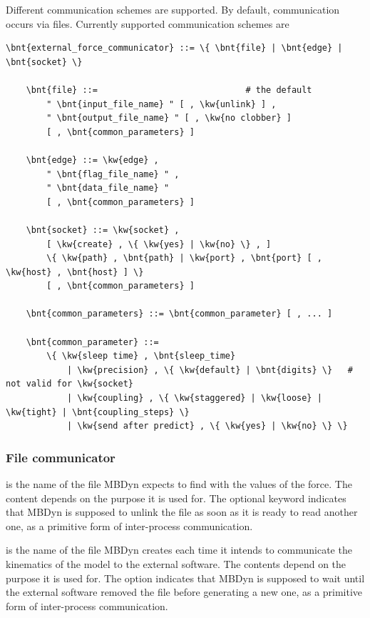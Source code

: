 Different communication schemes are supported.
By default, communication occurs via files.
Currently supported communication schemes are
\begin{Verbatim}[commandchars=\\\{\}]
    \bnt{external_force_communicator} ::= \{ \bnt{file} | \bnt{edge} | \bnt{socket} \}

    \bnt{file} ::=                             # the default
        " \bnt{input_file_name} " [ , \kw{unlink} ] ,
        " \bnt{output_file_name} " [ , \kw{no clobber} ]
        [ , \bnt{common_parameters} ]

    \bnt{edge} ::= \kw{edge} ,
        " \bnt{flag_file_name} " ,
        " \bnt{data_file_name} "
        [ , \bnt{common_parameters} ]

    \bnt{socket} ::= \kw{socket} ,
        [ \kw{create} , \{ \kw{yes} | \kw{no} \} , ]
        \{ \kw{path} , \bnt{path} | \kw{port} , \bnt{port} [ , \kw{host} , \bnt{host} ] \}
        [ , \bnt{common_parameters} ]

    \bnt{common_parameters} ::= \bnt{common_parameter} [ , ... ]

    \bnt{common_parameter} ::=
        \{ \kw{sleep time} , \bnt{sleep_time}
            | \kw{precision} , \{ \kw{default} | \bnt{digits} \}   # not valid for \kw{socket}
            | \kw{coupling} , \{ \kw{staggered} | \kw{loose} | \kw{tight} | \bnt{coupling_steps} \}
            | \kw{send after predict} , \{ \kw{yes} | \kw{no} \} \}
\end{Verbatim}

\subsubsection{File communicator}
 is the name of the file MBDyn expects to find
with the values of the force.
The content depends on the purpose it is used for.
The optional keyword  indicates that MBDyn is supposed
to unlink the file as soon as it is ready to read another one,
as a primitive form of inter-process communication.

 is the name of the file MBDyn creates
each time it intends to communicate the kinematics of the model
to the external software.
The contents depend on the purpose it is used for.
The option  indicates that MBDyn is supposed to wait
until the external software removed the file before generating a new one,
as a primitive form of inter-process communication.




